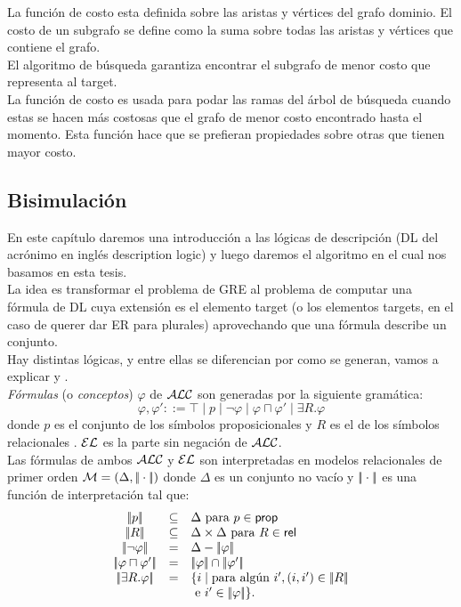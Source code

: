 La funci\'on de costo esta definida sobre las aristas y v\'ertices del grafo dominio. El costo de un subgrafo se define como la suma sobre todas las aristas y v\'ertices que contiene el grafo.\\
El algoritmo de b\'usqueda garantiza encontrar el subgrafo de menor costo que representa al target.\\

La funci\'on de costo es usada para podar las ramas del \'arbol de b\'usqueda cuando estas se hacen m\'as costosas que el grafo de menor costo encontrado hasta el momento. Esta funci\'on hace que se prefieran propiedades sobre otras que tienen mayor costo.

\subsection{Bisimulaci\'on}


En este cap\'itulo daremos una introducci\'on a las l\'ogicas de descripci\'on (DL del acr\'onimo en ingl\'es description logic) y luego daremos el algoritmo en el cual nos basamos en esta tesis.\\

La idea es transformar el problema de GRE al problema de computar una f\'ormula de DL cuya extensi\'on es el elemento target (o los elementos targets, en el caso de querer dar ER para plurales) aprovechando que una f\'ormula describe un conjunto.\\

Hay distintas l\'ogicas, y entre ellas se diferencian por como se generan, vamos a explicar \alc y \el.\\

\emph{F\'ormulas} (o \emph{conceptos}) $\varphi$ de $\mathcal{ALC}$ son generadas por la siguiente gram\'atica:
$$
\varphi,\varphi' ::= \top \mid p \mid \neg \varphi \mid \varphi \sqcap \varphi'
\mid \exists R. \varphi
$$
donde $p$ es el conjunto de los s\'imbolos proposicionales \prop y $R$ es el de los s\'imbolos relacionales \rel. $\mathcal{EL}$ es la parte sin negaci\'on de $\mathcal{ALC}$.\\

Las f\'ormulas de ambos $\mathcal{ALC}$ y $\mathcal{EL}$ son interpretadas en modelos relacionales de primer orden $\mathcal{M} = (\Delta,|\!|\cdot|\!|)$ donde
$\Delta$ es un conjunto no vac\'io y $|\!|\cdot|\!|$ es una funci\'on de interpretaci\'on tal que:
$$
\begin{array}{ccl}
\interp{p} & \subseteq & \Delta  \mbox{ para $p \in \prop$}\\
\interp{R} & \subseteq & \Delta \times \Delta  \mbox{ para $R \in \rel$}\\
\interp{\neg \varphi} & = & \Delta - \interp{\varphi}\\
\interp{\varphi \sqcap \varphi'} & = & \interp{\varphi} \cap \interp{\varphi'}\\
\interp{\exists R.\varphi} & = & \{i \mid \mbox{para alg\'un } i', (i,i') \in \interp{R}\\
& & \mbox{ e } i' \in \interp{\varphi} \}.\\
\end{array}
$$

